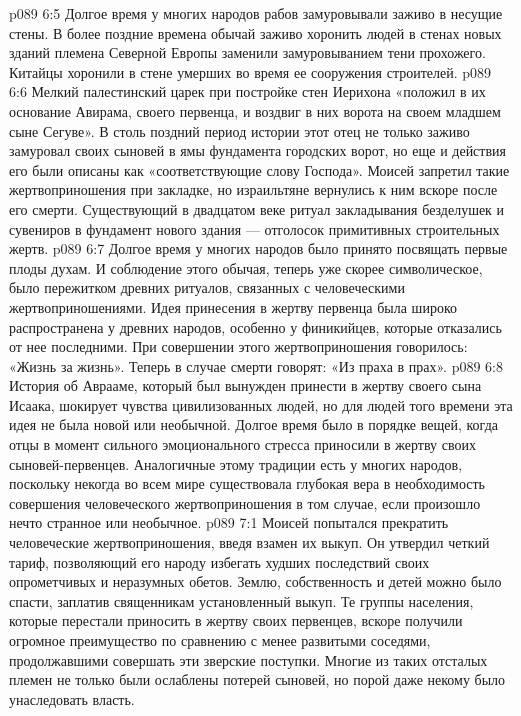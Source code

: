 \vs p089 6:5 Долгое время у многих народов рабов замуровывали заживо в несущие стены. В более поздние времена обычай заживо хоронить людей в стенах новых зданий племена Северной Европы заменили замуровыванием тени прохожего. Китайцы хоронили в стене умерших во время ее сооружения строителей.
\vs p089 6:6 Мелкий палестинский царек при постройке стен Иерихона «положил в их основание Авирама, своего первенца, и воздвиг в них ворота на своем младшем сыне Сегуве». В столь поздний период истории этот отец не только заживо замуровал своих сыновей в ямы фундамента городских ворот, но еще и действия его были описаны как «соответствующие слову Господа». Моисей запретил такие жертвоприношения при закладке, но израильтяне вернулись к ним вскоре после его смерти. Существующий в двадцатом веке ритуал закладывания безделушек и сувениров в фундамент нового здания --- отголосок примитивных строительных жертв.
\vs p089 6:7 \pc Долгое время у многих народов было принято посвящать первые плоды духам. И соблюдение этого обычая, теперь уже скорее символическое, было пережитком древних ритуалов, связанных с человеческими жертвоприношениями. Идея принесения в жертву первенца была широко распространена у древних народов, особенно у финикийцев, которые отказались от нее последними. При совершении этого жертвоприношения говорилось: «Жизнь за жизнь». Теперь в случае смерти говорят: «Из праха в прах».
\vs p089 6:8 История об Аврааме, который был вынужден принести в жертву своего сына Исаака, шокирует чувства цивилизованных людей, но для людей того времени эта идея не была новой или необычной. Долгое время было в порядке вещей, когда отцы в момент сильного эмоционального стресса приносили в жертву своих сыновей\hyp{}первенцев. Аналогичные этому традиции есть у многих народов, поскольку некогда во всем мире существовала глубокая вера в необходимость совершения человеческого жертвоприношения в том случае, если произошло нечто странное или необычное.
\vs p089 7:1 Моисей попытался прекратить человеческие жертвоприношения, введя взамен их выкуп. Он утвердил четкий тариф, позволяющий его народу избегать худших последствий своих опрометчивых и неразумных обетов. Землю, собственность и детей можно было спасти, заплатив священникам установленный выкуп. Те группы населения, которые перестали приносить в жертву своих первенцев, вскоре получили огромное преимущество по сравнению с менее развитыми соседями, продолжавшими совершать эти зверские поступки. Многие из таких отсталых племен не только были ослаблены потерей сыновей, но порой даже некому было унаследовать власть.
